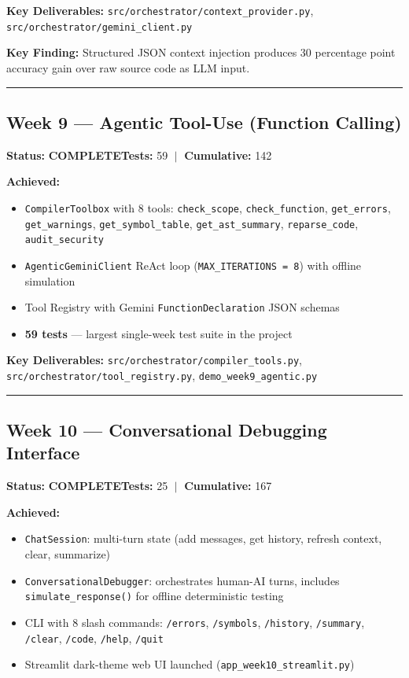 \documentclass[a4paper,11pt]{article}
\newcommand{\done}{\colorbox{green!25}{\textbf{\small COMPLETE}}}
\begin{document}
\textbf{Key Deliverables:} \texttt{src/orchestrator/context\_provider.py}, \texttt{src/orchestrator/gemini\_client.py}

\textbf{Key Finding:} Structured JSON context injection produces 30 percentage point accuracy gain over raw source code as LLM input.

\vspace{4pt}\hrule\vspace{6pt}

\subsection{Week 9 --- Agentic Tool-Use (Function Calling)}

\textbf{Status:} \done \hfill \textbf{Tests:} 59 $\;|\;$ \textbf{Cumulative:} 142

\textbf{Achieved:}
\begin{itemize}[leftmargin=*, itemsep=1pt]
    \item \texttt{CompilerToolbox} with 8 tools: \texttt{check\_scope}, \texttt{check\_function}, \texttt{get\_errors}, \texttt{get\_warnings}, \texttt{get\_symbol\_table}, \texttt{get\_ast\_summary}, \texttt{reparse\_code}, \texttt{audit\_security}
    \item \texttt{AgenticGeminiClient} ReAct loop (\texttt{MAX\_ITERATIONS = 8}) with offline simulation
    \item Tool Registry with Gemini \texttt{FunctionDeclaration} JSON schemas
    \item \textbf{59 tests} --- largest single-week test suite in the project
\end{itemize}

\textbf{Key Deliverables:} \texttt{src/orchestrator/compiler\_tools.py}, \texttt{src/orchestrator/tool\_registry.py}, \texttt{demo\_week9\_agentic.py}

\vspace{4pt}\hrule\vspace{6pt}

\subsection{Week 10 --- Conversational Debugging Interface}

\textbf{Status:} \done \hfill \textbf{Tests:} 25 $\;|\;$ \textbf{Cumulative:} 167

\textbf{Achieved:}
\begin{itemize}[leftmargin=*, itemsep=1pt]
    \item \texttt{ChatSession}: multi-turn state (add messages, get history, refresh context, clear, summarize)
    \item \texttt{ConversationalDebugger}: orchestrates human-AI turns, includes \texttt{simulate\_response()} for offline deterministic testing
    \item CLI with 8 slash commands: \texttt{/errors}, \texttt{/symbols}, \texttt{/history}, \texttt{/summary}, \texttt{/clear}, \texttt{/code}, \texttt{/help}, \texttt{/quit}
    \item Streamlit dark-theme web UI launched (\texttt{app\_week10\_streamlit.py})
\end{itemize}
\end{document}
